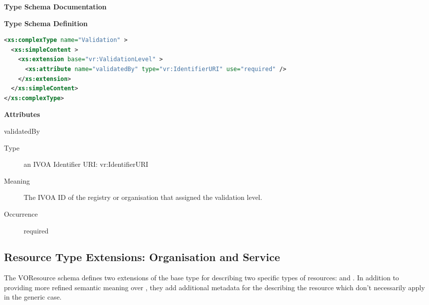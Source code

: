 \documentclass[11pt,a4paper]{ivoa}
\begin{document}
\begingroup
      	\renewcommand*\descriptionlabel[1]{%
      	\hbox to 5.5em{\emph{#1}\hfil}}\vspace{2ex}\noindent\textbf{ Type Schema Documentation}


\vspace{1ex}\noindent\textbf{ Type Schema Definition}

\begin{lstlisting}[language=XML,basicstyle=\footnotesize]
<xs:complexType name="Validation" >
  <xs:simpleContent >
    <xs:extension base="vr:ValidationLevel" >
      <xs:attribute name="validatedBy" type="vr:IdentifierURI" use="required" />
    </xs:extension>
  </xs:simpleContent>
</xs:complexType>
\end{lstlisting}

\vspace{0.5ex}\noindent\textbf{ Attributes}

\begingroup\small\begin{bigdescription}
\item[validatedBy]
\begin{description}
\item[Type] an IVOA Identifier URI: vr:IdentifierURI
\item[Meaning] 
               The IVOA ID of the registry or organisation that
               assigned the validation level.  
             
\item[Occurrence] required

\end{description}


\end{bigdescription}\endgroup

\endgroup

\subsection{Resource Type Extensions:  Organisation and Service}

The VOResource schema defines two extensions of the base
 type for describing two specific types of
resources:   and .  In
addition to providing more refined semantic meaning over
, they add additional metadata for the
describing the resource which don't necessarily apply in the generic
case. 
\end{document}
